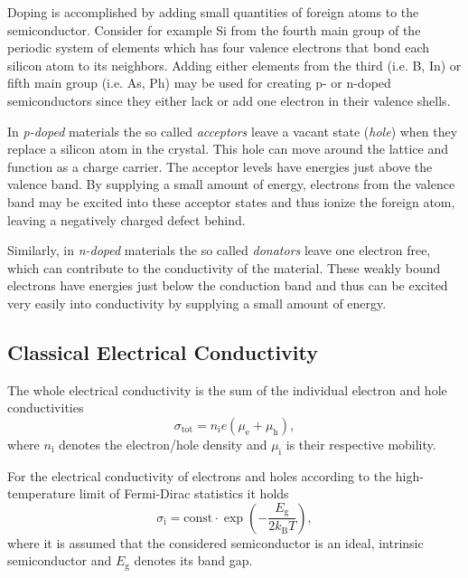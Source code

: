 Doping is accomplished by adding small quantities of foreign atoms to the semiconductor.
Consider for example Si from the fourth main group of the periodic system of elements which has four valence electrons that bond each silicon atom to its neighbors.
Adding either elements from the third (i.e. B, In) or fifth main group (i.e. As, Ph) may be used for creating p- or n-doped semiconductors since they either lack or add one electron in their valence shells.

In \textit{p-doped} materials the so called \textit{acceptors} leave a vacant state (\textit{hole}) when they replace a silicon atom in the crystal.
This hole can move around the lattice and function as a charge carrier.
The acceptor levels have energies just above the valence band.
By supplying a small amount of energy, electrons from the valence band may be excited into these acceptor states and thus ionize the foreign atom, leaving a negatively charged defect behind.

Similarly, in \textit{n-doped} materials the so called \textit{donators} leave one electron free, which can contribute to the conductivity of the material.
These weakly bound electrons have energies just below the conduction band and thus can be excited very easily into conductivity by supplying a small amount of energy.

\subsection{Classical Electrical Conductivity}
The whole electrical conductivity is the sum of the individual electron and hole conductivities
\begin{equation*}
	\sigma_\text{tot} = n_\text{i}e\left(\mu_\text{e} + \mu_\text{h}\right),
\end{equation*}
where $n_\text{i}$ denotes the electron/hole density and $\mu_\text{i}$ is their respective mobility.

For the electrical conductivity of electrons and holes according to the high-temperature limit of Fermi-Dirac statistics it holds
\begin{equation*}
	\sigma_\text{i} = \text{const}\cdot\exp\left(-\frac{E_\text{g}}{2k_\text{B}T}\right),
\end{equation*}
where it is assumed that the considered semiconductor is an ideal, intrinsic semiconductor and $E_\text{g}$ denotes its band gap.

